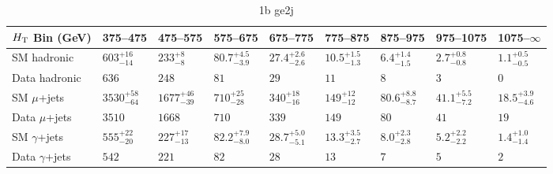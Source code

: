 \documentclass[8pt]{article}
\def\scalht{\mbox{$H_{\rm{T}}$}\xspace}
\newcommand\T{\rule{0pt}{2.6ex}}
\newcommand\B{\rule[-1.2ex]{0pt}{0pt}}
\begin{document}
\begin{table}[ht!]
\caption{1b ge2j}
\label{tab:ensemble-1b ge2j}
\centering
\begin{tabular}{ lllllllll }

\hline
\scalht Bin (GeV)       & 375--475                       & 475--575                       & 575--675                       & 675--775                       & 775--875                       & 875--975                       & 975--1075                      & 1075--$\infty$                 \\ [1.000000ex]
\hline
SM hadronic\T           & $603^{+16}_{-14}$              & $233^{+8}_{-8}$                & $80.7^{+4.5}_{-3.9}$           & $27.4^{+2.6}_{-2.6}$           & $10.5^{+1.5}_{-1.3}$           & $6.4^{+1.4}_{-1.5}$            & $2.7^{+0.8}_{-0.8}$            & $1.1^{+0.5}_{-0.5}$            \\ 
Data hadronic\B         & $636$                          & $248$                          & $81$                           & $29$                           & $11$                           & $8$                            & $3$                            & $0$                            \\ 
\hline
SM $\mu$+jets\T         & $3530^{+58}_{-64}$             & $1677^{+46}_{-39}$             & $710^{+25}_{-28}$              & $340^{+18}_{-16}$              & $149^{+12}_{-12}$              & $80.6^{+8.8}_{-8.7}$           & $41.1^{+5.5}_{-7.2}$           & $18.5^{+3.9}_{-4.6}$           \\ 
Data $\mu$+jets\B       & $3510$                         & $1668$                         & $710$                          & $339$                          & $149$                          & $80$                           & $41$                           & $19$                           \\ 
\hline
SM $\gamma$+jets\T      & $555^{+22}_{-20}$              & $227^{+17}_{-13}$              & $82.2^{+7.9}_{-8.0}$           & $28.7^{+5.0}_{-5.1}$           & $13.3^{+3.5}_{-2.7}$           & $8.0^{+2.3}_{-2.8}$            & $5.2^{+2.2}_{-2.2}$            & $1.4^{+1.0}_{-1.4}$            \\ 
Data $\gamma$+jets\B    & $542$                          & $221$                          & $82$                           & $28$                           & $13$                           & $7$                            & $5$                            & $2$                            \\ 
\hline

\end{tabular}
\end{table}
\end{document}
